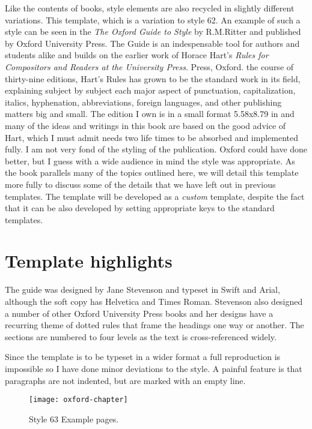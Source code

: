 Like the contents of books, style elements are also recycled in slightly different variations. This template, which is a variation to style 62. An example of such a style can be seen in the \emph{The Oxford Guide to Style} by R.M.Ritter and published by Oxford University Press. The Guide is an indespensable tool for authors and students alike and builds on the earlier work of Horace Hart’s \emph{Rules for Compositors and Readers at the University Press}. Press, Oxford. the course of thirty-nine editions, Hart's Rules has grown to be the standard
work in its field, explaining subject by subject each major aspect of
punctuation, capitalization, italics, hyphenation, abbreviations, foreign
languages, and other publishing matters big and small. The edition I own is in a small format 5.58x8.79 in and many of the ideas and writings in this book are based on the good advice of Hart, which I must admit needs two life times to be absorbed and implemented fully. I am not very fond of the styling of the publication. Oxford could have done better, but I guess with a wide audience in mind the style was appropriate. As the book parallels many of the topics outlined here, we will detail this template more fully to discuss some of the details that we have left out in previous templates. The template will be developed as a \emph{custom} template, despite the fact that it can be also developed by setting appropriate keys to the standard templates.


\section{Template highlights}

The guide was designed by Jane Stevenson and typeset in Swift and Arial, although the soft copy has Helvetica and Times Roman. Stevenson also designed a number of other Oxford University Press books and her designs have a recurring theme of dotted rules that frame the headings one way or another. The sections are numbered to four levels as the text is cross-referenced widely.

Since the template is to be typeset in a wider format a full reproduction is impossible so I have done minor deviations to the style. A painful feature is that paragraphs are not indented, but are marked with an empty line.

\begin{figure}[ht]
\centering
\texttt{[image: oxford-chapter]}%
\caption{Style 63 Example pages.}
\end{figure}

